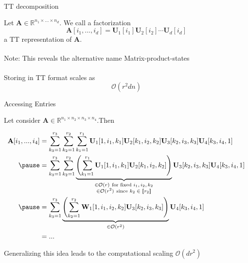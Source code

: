 \documentclass{beamer}
\newcommand{\bvec}[1]{\mathbf{#1}}
\newcommand{\vA}{\bvec{A}}
\newcommand{\vU}{\bvec{U}}
\newcommand{\vW}{\bvec{W}}
\begin{document}
\begin{frame}{TT decomposition}

Let $\vA\in\mathbb{R}^{n_1 \times ... \times n_d}$. We call a factorization
$$
\vA [i_1,...,i_d]
=
\vU_1[i_1] \vU_2[i_2] \cdots \vU_{d}[i_d]
$$
a TT representation of $\vA$.\\
~\\
Note: This reveals the alternative name Matrix-product-states\\
~\\
Storing in TT format scales as \pause
$$
\mathcal{O}(r^2dn)
$$

\end{frame}

\begin{frame}{Accessing Entries}

Let consider $\vA \in \mathbb{R}^{n_1\times n_2 \times n_3 \times n_4 }$.Then
\begin{footnotesize}
$$
\begin{aligned}
\vA[i_1,...,i_4]
&=
\sum_{k_3=1}^{r_3}\sum_{k_2=1}^{r_2}\sum_{k_1=1}^{r_1}
\vU_1[1,i_1, k_1] \vU_2[k_1,i_2, k_2] \vU_3[k_2,i_3, k_3] \vU_4[k_3,i_4, 1]\\
\pause
&=
\sum_{k_3=1}^{r_3}\sum_{k_2=1}^{r_2}
\underbrace{\left(
\sum_{k_1=1}^{r_1}
\vU_1[1,i_1, k_1] \vU_2[k_1,i_2, k_2]
\right)}_{\substack{\in \mathcal{O}(r)~\text{for fixed $i_1,i_2,k_2$}\\\in\mathcal{O}(r^2)~\text{since $k_2\in[\![ r_2]\!]$} }}
\vU_3[k_2,i_3, k_3] \vU_4[k_3,i_4, 1]\\
\pause
&=
\sum_{k_3=1}^{r_3}
\underbrace{
\left(
\sum_{k_2=1}^{r_2} \vW_1[1,i_1,i_2, k_2] \vU_3[k_2,i_3, k_3] 
\right)}_{\in \mathcal{O}(r^2)}
\vU_4[k_3,i_4, 1]\\
&= ...
\end{aligned}
$$
\end{footnotesize}

Generalizing this idea leads to the computational scaling 
$
\mathcal{O}(dr^2)
$
\end{frame}
\end{document}
